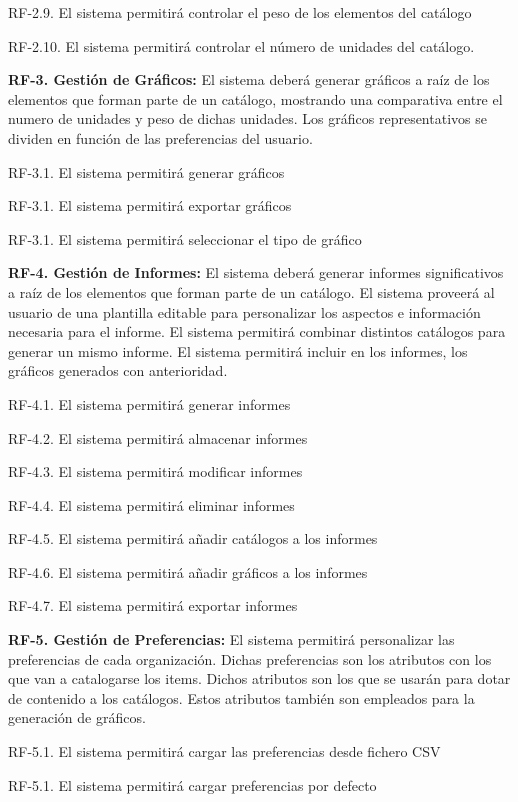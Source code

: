\documentclass[a4paper,11pt]{book}
\begin{document}
	RF-2.9. El sistema permitirá controlar el peso de los elementos del catálogo

	RF-2.10. El sistema permitirá controlar el número de unidades del catálogo. 
	

\textbf{RF-3. Gestión de Gráficos:} El sistema deberá generar gráficos a raíz de los elementos que forman parte de un catálogo, mostrando una comparativa entre el numero de unidades y peso de dichas unidades. Los gráficos representativos se dividen en función de las preferencias del usuario. 


	RF-3.1. El sistema permitirá generar gráficos
	
	RF-3.1. El sistema permitirá exportar gráficos
	
	RF-3.1. El sistema permitirá seleccionar el tipo de gráfico	


	 
\textbf{RF-4. Gestión de Informes:} El sistema deberá generar informes significativos a raíz de los elementos que forman parte de un catálogo. El sistema proveerá al usuario de una plantilla editable para personalizar los aspectos e información necesaria para el informe. El sistema permitirá combinar distintos catálogos para generar un mismo informe.  El sistema permitirá incluir en los informes, los gráficos generados con anterioridad. 

	

	RF-4.1. El sistema permitirá generar informes
	
	RF-4.2. El sistema permitirá almacenar informes
	
	RF-4.3. El sistema permitirá modificar informes
	
	RF-4.4. El sistema permitirá eliminar informes
	
	RF-4.5. El sistema permitirá añadir catálogos a los informes
	
	RF-4.6. El sistema permitirá añadir gráficos a los informes
	
	RF-4.7. El sistema permitirá exportar informes
	

\textbf{RF-5. Gestión de Preferencias:} El sistema permitirá personalizar las preferencias de cada organización. Dichas preferencias son los atributos con los que van a catalogarse los items. Dichos atributos son los que se usarán para dotar de contenido a los catálogos. Estos atributos también son empleados para la generación de gráficos. 


	RF-5.1. El sistema permitirá cargar las preferencias desde fichero CSV
	
	RF-5.1. El sistema permitirá cargar preferencias por defecto 
	
\end{document}
